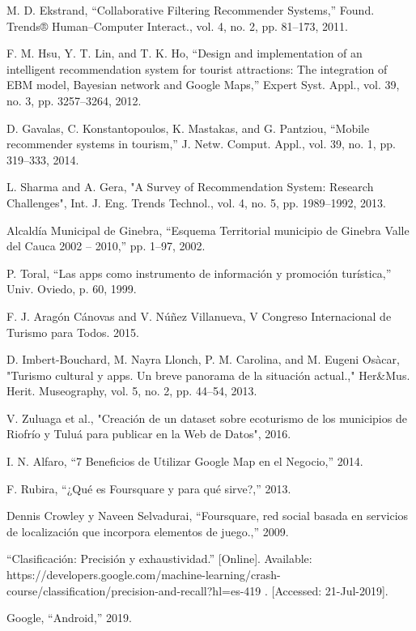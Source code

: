 \documentclass[12pt,letterpaper,openany]{book}
\begin{document}
\begin{thebibliography}{1}
 M. D. Ekstrand, “Collaborative Filtering Recommender Systems,” Found. Trends® Human–Computer Interact., vol. 4, no. 2, pp. 81–173, 2011.

 F. M. Hsu, Y. T. Lin, and T. K. Ho, “Design and implementation of an intelligent recommendation system for tourist attractions: The integration of EBM model, Bayesian network and Google Maps,” Expert Syst. Appl., vol. 39, no. 3, pp. 3257–3264, 2012.

 D. Gavalas, C. Konstantopoulos, K. Mastakas, and G. Pantziou, “Mobile recommender systems in tourism,” J. Netw. Comput. Appl., vol. 39, no. 1, pp. 319–333, 2014.

 L. Sharma and A. Gera, "A Survey of Recommendation System: Research Challenges", Int. J. Eng. Trends Technol., vol. 4, no. 5, pp. 1989–1992, 2013.

 Alcaldía Municipal de Ginebra, “Esquema Territorial municipio de Ginebra Valle del Cauca 2002 – 2010,” pp. 1–97, 2002.

 P. Toral, “Las apps como instrumento de información y promoción turística,” Univ. Oviedo, p. 60, 1999.

 F. J. Aragón Cánovas and V. Núñez Villanueva, V Congreso Internacional de Turismo para Todos. 2015.

 D. Imbert-Bouchard, M. Nayra Llonch, P. M. Carolina, and M. Eugeni Osàcar, "Turismo cultural y apps. Un breve panorama de la situación actual.," Her\&Mus. Herit. Museography, vol. 5, no. 2, pp. 44–54, 2013.

 V. Zuluaga et al., "Creación de un dataset sobre ecoturismo de los municipios de Riofrío y Tuluá para publicar en la Web de Datos", 2016.

 I. N. Alfaro, “7 Beneficios de Utilizar Google Map en el Negocio,” 2014.

 F. Rubira, “¿Qué es Foursquare y para qué sirve?,” 2013. 

 Dennis Crowley y Naveen Selvadurai, “Foursquare, red social basada en servicios de localización que incorpora elementos de juego.,” 2009.

 “Clasificación: Precisión y exhaustividad.” [Online]. Available: https://developers.google.com/machine-learning/crash-course/classification/precision-and-recall?hl=es-419 . [Accessed: 21-Jul-2019].

 Google, “Android,” 2019.


\end{thebibliography}
\end{document}
